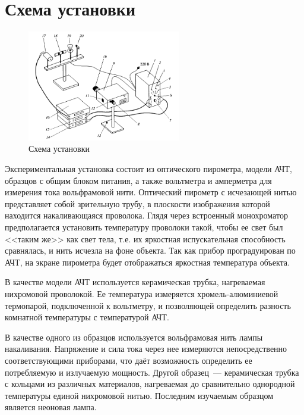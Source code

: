 \section{Схема установки}
\begin{figure}[H]
    \centering
    \includegraphics[width=0.6\textwidth]{img/scheme8_1.png}
    \caption{Схема установки}
    \label{fig:scheme}
\end{figure}
Экспериментальная установка состоит из оптического пирометра, модели АЧТ, образцов с общим блоком питания, а также вольтметра и амперметра для измерения тока вольфрамовой нити. Оптический пирометр с исчезающей нитью представляет собой зрительную трубу, в плоскости изображения которой находится накаливающаяся проволока. Глядя через встроенный монохроматор предполагается установить температуру проволоки такой, чтобы ее свет был <<таким же>> как свет тела, т.е. их яркостная испускательная способность сравнялась, и нить исчезла на фоне объекта. Так как прибор проградуирован по АЧТ, на экране пирометра будет отображаться яркостная температура объекта.

В качестве модели АЧТ используется керамическая трубка, нагреваемая нихромовой проволокой. Ее температура измеряется хромель-алюминиевой термопарой, подключенной к вольтметру, и позволяющей определить разность комнатной температуры с температурой АЧТ.

В качестве одного из образцов используется вольфрамовая нить лампы накаливания. Напряжение и сила тока через нее измеряются непосредственно соответствующими приборами, что даёт возможность определить ее потребляемую и излучаемую мощность. Другой образец~--- керамическая трубка с кольцами из различных материалов, нагреваемая до сравнительно однородной температуры единой нихромовой нитью. Последним изучаемым образцом является неоновая лампа.